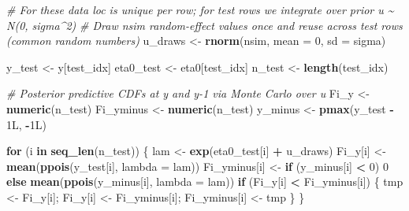 \documentclass[
  letterpaper,
]{krantz}
\newenvironment{Shaded}{\begin{snugshade}}{\end{snugshade}}
\newcommand{\AttributeTok}[1]{\textcolor[rgb]{0.13,0.29,0.53}{#1}}
\newcommand{\CommentTok}[1]{\textcolor[rgb]{0.56,0.35,0.01}{\textit{#1}}}
\newcommand{\ControlFlowTok}[1]{\textcolor[rgb]{0.13,0.29,0.53}{\textbf{#1}}}
\newcommand{\DecValTok}[1]{\textcolor[rgb]{0.00,0.00,0.81}{#1}}
\newcommand{\FunctionTok}[1]{\textcolor[rgb]{0.13,0.29,0.53}{\textbf{#1}}}
\newcommand{\NormalTok}[1]{#1}
\newcommand{\OtherTok}[1]{\textcolor[rgb]{0.56,0.35,0.01}{#1}}
\newcommand{\SpecialCharTok}[1]{\textcolor[rgb]{0.81,0.36,0.00}{\textbf{#1}}}
\begin{document}
\begin{Shaded}
\begin{Highlighting}[]
  \CommentTok{\# For these data loc is unique per row; for test rows we integrate over prior u \textasciitilde{} N(0, sigma\^{}2)}
  \CommentTok{\# Draw nsim random{-}effect values once and reuse across test rows (common random numbers)}
\NormalTok{  u\_draws }\OtherTok{\textless{}{-}} \FunctionTok{rnorm}\NormalTok{(nsim, }\AttributeTok{mean =} \DecValTok{0}\NormalTok{, }\AttributeTok{sd =}\NormalTok{ sigma)}

\NormalTok{  y\_test }\OtherTok{\textless{}{-}}\NormalTok{ y[test\_idx]}
\NormalTok{  eta0\_test }\OtherTok{\textless{}{-}}\NormalTok{ eta0[test\_idx]}
\NormalTok{  n\_test }\OtherTok{\textless{}{-}} \FunctionTok{length}\NormalTok{(test\_idx)}

  \CommentTok{\# Posterior predictive CDFs at y and y{-}1 via Monte Carlo over u}
\NormalTok{  Fi\_y      }\OtherTok{\textless{}{-}} \FunctionTok{numeric}\NormalTok{(n\_test)}
\NormalTok{  Fi\_yminus }\OtherTok{\textless{}{-}} \FunctionTok{numeric}\NormalTok{(n\_test)}
\NormalTok{  y\_minus }\OtherTok{\textless{}{-}} \FunctionTok{pmax}\NormalTok{(y\_test }\SpecialCharTok{{-}} \DecValTok{1}\NormalTok{L, }\SpecialCharTok{{-}}\DecValTok{1}\NormalTok{L)}

  \ControlFlowTok{for}\NormalTok{ (i }\ControlFlowTok{in} \FunctionTok{seq\_len}\NormalTok{(n\_test)) \{}
\NormalTok{    lam }\OtherTok{\textless{}{-}} \FunctionTok{exp}\NormalTok{(eta0\_test[i] }\SpecialCharTok{+}\NormalTok{ u\_draws)}
\NormalTok{    Fi\_y[i] }\OtherTok{\textless{}{-}} \FunctionTok{mean}\NormalTok{(}\FunctionTok{ppois}\NormalTok{(y\_test[i], }\AttributeTok{lambda =}\NormalTok{ lam))}
\NormalTok{    Fi\_yminus[i] }\OtherTok{\textless{}{-}} \ControlFlowTok{if}\NormalTok{ (y\_minus[i] }\SpecialCharTok{\textless{}} \DecValTok{0}\NormalTok{) }\DecValTok{0} \ControlFlowTok{else} \FunctionTok{mean}\NormalTok{(}\FunctionTok{ppois}\NormalTok{(y\_minus[i], }\AttributeTok{lambda =}\NormalTok{ lam))}
    \ControlFlowTok{if}\NormalTok{ (Fi\_y[i] }\SpecialCharTok{\textless{}}\NormalTok{ Fi\_yminus[i]) \{ tmp }\OtherTok{\textless{}{-}}\NormalTok{ Fi\_y[i]; Fi\_y[i] }\OtherTok{\textless{}{-}}\NormalTok{ Fi\_yminus[i]; Fi\_yminus[i] }\OtherTok{\textless{}{-}}\NormalTok{ tmp \}}
\NormalTok{  \}}


\end{Highlighting}
\end{Shaded}
\end{document}
